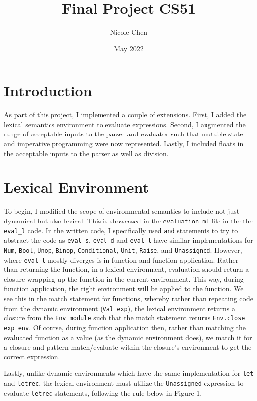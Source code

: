 \documentclass{article}
\title{Final Project CS51}
\author{Nicole Chen }
\date{May 2022}
\def\code#1{\texttt{#1}}
\begin{document}
\graphicspath{ {./images/} }

\maketitle

\section{Introduction}
As part of this project, I implemented a couple of extensions. First, I added the lexical semantics environment to evaluate expressions. Second, I augmented the range of acceptable inputs to the parser and evaluator such that mutable state and imperative programming were now represented. Lastly, I included floats in the acceptable inputs to the parser as well as division.

\section{Lexical Environment}
To begin, I modified the scope of environmental semantics to include not just dynamical but also lexical. This is showcased in the \code{evaluation.ml} file in the the \code{eval\_l} code. In the written code, I specifically used \code{and} statements to try to abstract the code as \code{eval\_s}, \code{eval\_d} and \code{eval\_l} have similar implementations for \code{Num}, \code{Bool}, \code{Unop}, \code{Binop}, \code{Conditional}, \code{Unit}, \code{Raise}, and \code{Unassigned}. However, where \code{eval\_l} mostly diverges is in function and function application. Rather than returning the function, in a lexical environment, evaluation should return a closure wrapping up the function in the current environment. This way, during function application, the right environment will be applied to the function. We see this in the match statement for functions, whereby rather than repeating code from the dynamic environment (\code{Val exp}), the lexical environment returns a closure from the \code{Env module} such that the match statement returns \code{Env.close exp env}. Of course, during function application then, rather than matching the evaluated function as a value (as the dynamic environment does), we match it for a closure and pattern match/evaluate within the closure's environment to get the correct expression. 

Lastly, unlike dynamic environments which have the same implementation for \code{let} and \code{letrec}, the lexical environment must utilize the \code{Unassigned} expression to evaluate \code{letrec} statements, following the rule below in Figure 1.
\end{document}
